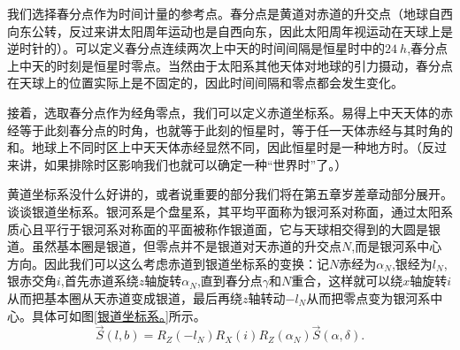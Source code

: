 \documentclass[11pt, a4paper, oneside]{ctexart}
\numberwithin{equation}{subsection}
\begin{document}
我们选择春分点作为时间计量的参考点。春分点是黄道对赤道的升交点（地球自西向东公转，反过来讲太阳周年运动也是自西向东，因此太阳周年视运动在天球上是逆时针的）。可以定义春分点连续两次上中天的时间间隔是恒星时中的$\qty{24}{h}$,春分点上中天的时刻是恒星时零点。当然由于太阳系其他天体对地球的引力摄动，春分点在天球上的位置实际上是不固定的，因此时间间隔和零点都会发生变化。

接着，选取春分点作为经角零点，我们可以定义赤道坐标系。易得上中天天体的赤经等于此刻春分点的时角，也就等于此刻的恒星时，等于任一天体赤经与其时角的和。地球上不同时区上中天天体赤经显然不同，因此恒星时是一种地方时。（反过来讲，如果排除时区影响我们也就可以确定一种“世界时”了。）

黄道坐标系没什么好讲的，或者说重要的部分我们将在第五章岁差章动部分展开。谈谈银道坐标系。银河系是个盘星系，其平均平面称为银河系对称面，通过太阳系质心且平行于银河系对称面的平面被称作银道面，它与天球相交得到的大圆是银道。虽然基本圈是银道，但零点并不是银道对天赤道的升交点$N$,而是银河系中心方向。因此我们可以这么考虑赤道到银道坐标系的变换：记$N$赤经为$\alpha_{N}$,银经为$l_{N}$,银赤交角$i$,首先赤道系绕$z$轴旋转$\alpha_{N}$,直到春分点$\gamma$和$N$重合，这样就可以绕$x$轴旋转$i$从而把基本圈从天赤道变成银道，最后再绕$z$轴转动$-l_{N}$从而把零点变为银河系中心。具体可如图\ref{银道坐标系。}所示。
\begin{equation}
\vec{S}\left(l,b\right)=R_{Z}\left(-l_{N}\right)R_{X}\left(i\right)R_{Z}\left(\alpha_{N}\right)\vec{S}\left(\alpha,\delta{}\right).
\end{equation}
\end{document}
